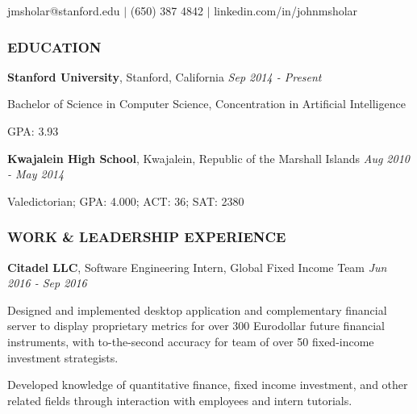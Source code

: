 \documentclass[11pt,letterpaper]{article}%
\begin{document}
\selectfont

\vspace{-1ex}
\centerline{jmsholar@stanford.edu $|$ (650) 387 4842 $|$ linkedin.com/in/johnmsholar}
\vspace{-1ex}

\vspace{.5em}
\subsubsection*{EDUCATION}
\vspace{-2ex}
\hrulefill
\small

\hspace{.6em} 
{\bf Stanford University}, Stanford, California \hfill \textit{Sep 2014 - Present}

\hspace{1.2em} 
{Bachelor of Science} in Computer Science, Concentration in Artificial Intelligence 

\hspace{1.2em} 
GPA: 3.93

\hspace{.6em} 
{\bf Kwajalein High School}, Kwajalein, Republic of the Marshall Islands \hfill \textit{Aug 2010 - May 2014}

\hspace{1.2em} 
Valedictorian; GPA: 4.000; ACT: 36; SAT: 2380

\vspace{.2em}
\subsubsection*{WORK \& LEADERSHIP EXPERIENCE}
\vspace{-2ex}
\hrulefill

\vspace{.3em}
\hspace{.6em} 
{\bf Citadel LLC}, Software Engineering Intern, Global Fixed Income Team \hfill \textit{Jun 2016 - Sep 2016}
\vspace{-.4em}
\begin{itemize*}
\item 
Designed and implemented desktop application and complementary financial server  to display proprietary metrics for over 300 Eurodollar future financial instruments, with to-the-second accuracy for team of over 50 fixed-income investment strategists.
\item
Developed knowledge of quantitative finance, fixed income investment, and other related fields through interaction with employees and intern tutorials.
\end{itemize*}
\end{document}
